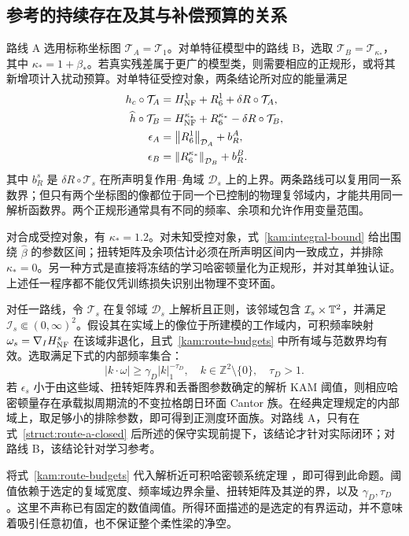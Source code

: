 \subsection{参考的持续存在及其与补偿预算的关系}
\label{kam:budgets-section}

路线 A 选用标称坐标图 $\mathcal T_A=\mathcal T_1$。对单特征模型中的路线 B，选取 $\mathcal T_B=\mathcal T_{\kappa_*}$，其中 $\kappa_*=1+\beta_*$。若真实残差属于更广的模型类，则需要相应的正规形，或将其新增项计入扰动预算。对单特征受控对象，两条结论所对应的能量满足
\begin{equation}\label{kam:route-budgets}
\begin{aligned}
 h_c\circ\mathcal T_A
   &=H_{\rm NF}^{1}+R_6^{1}+\delta R\circ\mathcal T_A,\\
 \widehat h\circ\mathcal T_B
   &=H_{\rm NF}^{\kappa_*}+R_6^{\kappa_*}
                                      -\delta R\circ\mathcal T_B,\\
 \epsilon_A&=\left\lVert R_6^{1}\right\rVert_{\mathcal D_A}+b_R^A,\\
 \epsilon_B&=\left\lVert R_6^{\kappa_*}\right\rVert_{\mathcal D_B}+b_R^B.
\end{aligned}
\end{equation}
其中 $b_R^s$ 是 $\delta R\circ\mathcal T_s$ 在所声明复作用--角域 $\mathcal D_s$ 上的上界。两条路线可以复用同一系数界；但只有两个坐标图的像都位于同一个已控制的物理复邻域内，才能共用同一解析函数界。两个正规形通常具有不同的频率、余项和允许作用变量范围。

对合成受控对象，有 $\kappa_*=1.2$。对未知受控对象，式~\eqref{kam:integral-bound} 给出围绕 $\widehat\beta$ 的参数区间；扭转矩阵及余项估计必须在所声明区间内一致成立，并排除 $\kappa_*=0$。另一种方式是直接将冻结的学习哈密顿量化为正规形，并对其单独认证。上述任一程序都不能仅凭训练损失识别出物理不变环面。

\begin{proposition}[连续模型的条件性持续存在结论]
\label{kam:flow-theorem}
对任一路线，令 $\mathcal T_s$ 在复邻域 $\mathcal D_s$ 上解析且正则，该邻域包含 $\mathcal I_s\times\mathbb T^2$，并满足 $\mathcal I_s\Subset(0,\infty)^2$。假设其在实域上的像位于所建模的工作域内，可积频率映射 $\omega_s=\nabla_IH_{\rm NF}^s$ 在该域非退化，且式~\eqref{kam:route-budgets} 中所有域与范数界均有效。选取满足下式的内部频率集合：
\begin{equation}\label{kam:flow-divisors}
 |k\cdot\omega|\ge\gamma_D|k|_1^{-\tau_D},
 \quad k\in\mathbb Z^2\setminus\{0\},\quad\tau_D>1.
\end{equation}
若 $\epsilon_s$ 小于由这些域、扭转矩阵界和丢番图参数确定的解析 KAM 阈值，则相应哈密顿量存在承载拟周期流的不变拉格朗日环面 Cantor 族。在经典定理规定的内部域上，取足够小的排除参数，即可得到正测度环面族。对路线 A，只有在式~\eqref{struct:route-a-closed} 后所述的保守实现前提下，该结论才针对实际闭环；对路线 B，该结论针对学习参考。
\end{proposition}

将式~\eqref{kam:route-budgets} 代入解析近可积哈密顿系统定理 \citep{poschel}，即可得到此命题。阈值依赖于选定的复域宽度、频率域边界余量、扭转矩阵及其逆的界，以及 $\gamma_D,\tau_D$。这里不声称已有固定的数值阈值。所得环面描述的是选定的有界运动，并不意味着吸引任意初值，也不保证整个柔性梁的净空。

